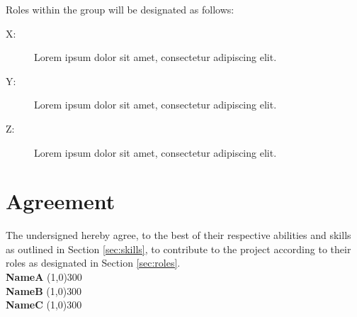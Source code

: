 \documentclass{article}
\newcommand{\groupmember}[1]{#1}
\newcommand{\role}[1]{#1}
\newcommand{\sigline}[2]{\vspace{2em} #1 \hfill \line(1,0){#2}}
\begin{document}
Roles within the group will be designated as follows:

\begin{description}
    \item[\role{X}:] Lorem ipsum dolor sit amet, consectetur adipiscing elit.
    \item[\role{Y}:] Lorem ipsum dolor sit amet, consectetur adipiscing elit.
    \item[\role{Z}:] Lorem ipsum dolor sit amet, consectetur adipiscing elit.
\end{description}

\section{Agreement} %
\label{par:agreement}
The undersigned hereby agree, to the best of their respective abilities and skills as outlined in Section \ref{sec:skills}, to contribute to the project according to their roles as designated in Section \ref{sec:roles}.%
\vspace{2em}\\
\sigline{\textbf{\groupmember{NameA}}}{300}\\
\sigline{\textbf{\groupmember{NameB}}}{300}\\
\sigline{\textbf{\groupmember{NameC}}}{300}\\
\end{document}
